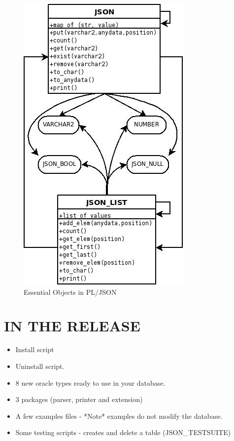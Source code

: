 \documentclass[11pt,twocolumn, a4paper]{article}
\begin{document}
\begin{figure}[!ht]
  \begin{center}
    \includegraphics[width=0.8\linewidth]{visual.jpg}
  \end{center} 
  \caption{Essential Objects in PL/JSON}
  \label{howjsonwork}
\end{figure}

\section*{IN THE RELEASE}
\begin{itemize}
\item Install script
\item Uninstall script.
\item 8 new oracle types ready to use in your database.
\item 3 packages (parser, printer and extension)
\item A few examples files - *Note* examples do not modify the database.
\item Some testing scripts - creates and delete a table (JSON\_TESTSUITE)
\end{itemize}
\end{document}
